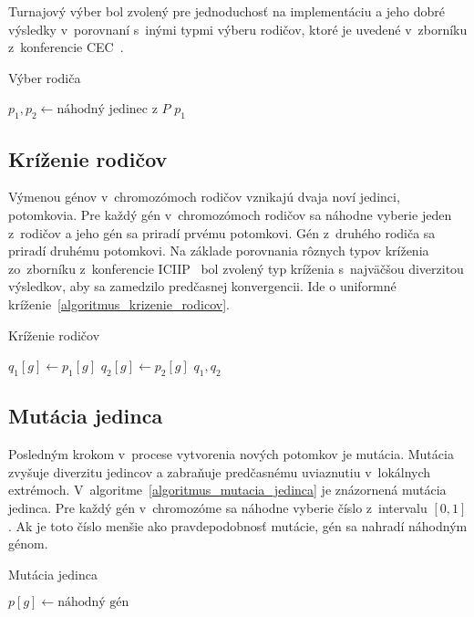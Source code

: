 Turnajový výber bol zvolený pre jednoduchosť na implementáciu a jeho dobré výsledky v~porovnaní s~inými typmi výberu rodičov, ktoré je uvedené v~zborníku z~konferencie CEC~\cite{farias2018parent}.

\begin{algorithm}[h]\label{algoritmus_vyber_rodica}
\caption{Výber rodiča}
  $p_1, p_2 \gets \text{náhodný jedinec z } P$\;
   {
    \Return $p_1$\;
  }
\end{algorithm}

\subsection*{Kríženie rodičov}
Výmenou génov v~chromozómoch rodičov vznikajú dvaja noví jedinci, potomkovia.
Pre každý gén v~chromozómoch rodičov sa náhodne vyberie jeden z~rodičov a jeho gén sa priradí prvému potomkovi.
Gén z~druhého rodiča sa priradí druhému potomkovi.
Na základe porovnania rôznych typov kríženia zo~zborníku z~konferencie ICIIP~\cite{bala2015comparative} bol zvolený typ kríženia s~najväčšou diverzitou výsledkov, aby sa zamedzilo predčasnej konvergencii.
Ide o uniformné kríženie~\ref{algoritmus_krizenie_rodicov}.

\begin{algorithm}[h]\label{algoritmus_krizenie_rodicov}
\caption{Kríženie rodičov}
   {
     {
      $q_1[g] \gets p_1[g]$\;
      $q_2[g] \gets p_2[g]$\;
    }
  }
  \Return $q_1, q_2$\;
\end{algorithm}

\subsection*{Mutácia jedinca}
Posledným krokom v~procese vytvorenia nových potomkov je mutácia.
Mutácia zvyšuje diverzitu jedincov a zabraňuje predčasnému uviaznutiu v~lokálnych extrémoch.
V~algoritme~\ref{algoritmus_mutacia_jedinca} je znázornená mutácia jedinca.
Pre každý gén v~chromozóme sa náhodne vyberie číslo z~intervalu $[0,1]$.
Ak je toto číslo menšie ako pravdepodobnosť mutácie, gén sa nahradí náhodným génom.

\begin{algorithm}[h]\label{algoritmus_mutacia_jedinca}
\caption{Mutácia jedinca}
   {
     {
      $p[g] \gets \text{náhodný gén}$\;
    }
  }
\end{algorithm}

